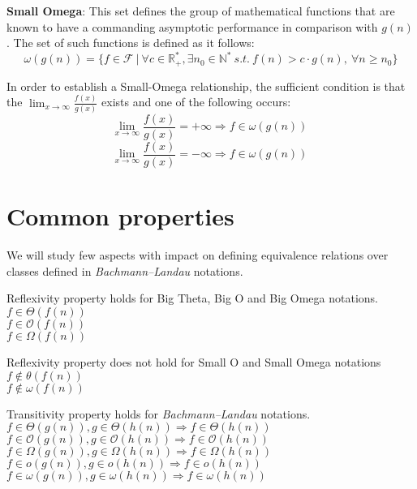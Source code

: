 \begin{definition}   
 \textbf{Small Omega}:
  This set defines the group of mathematical functions that are known to have a commanding asymptotic performance in comparison with  $g(n)$.
  The set of such functions is defined as it follows:
  \[\omega(g(n)) = \lbrace f \in \mathcal{F}\ |\ \forall c \in \mathbb{R}^{*}_{+}, \exists n_{0} \in \mathbb{N}^{*}\ s.t.\  f(n) > c \cdot g(n),\  \forall n \geq n_{0} \rbrace\]
  \end{definition}  
  \begin{lemma}
In order to establish a Small-Omega relationship, the sufficient condition is that the $ \lim_{x\to\infty} \frac{f(x)}{g(x)}$ exists and one of the following occurs:
  \[  \lim_{x\to\infty} \frac{f(x)}{g(x)} = +\infty \Rightarrow f \in \omega(g(n))\ \]   
  \[  \lim_{x\to\infty} \frac{f(x)}{g(x)} = -\infty \Rightarrow f \in \omega(g(n))\ \]  
  \end{lemma}

\section{Common properties}
We will study few aspects with impact on defining equivalence relations over classes defined in \textit{Bachmann–Landau} notations.
 \hfill\break
 \begin{theorem} Reflexivity property holds for Big Theta, Big O and Big Omega notations.  \\  $ f \in \Theta(f(n)) $ \\$ f \in \mathcal{O}(f(n)) $ \\$ f \in \Omega(f(n)) $
 \end{theorem}

\begin{theorem} Reflexivity property does not hold for Small O and Small Omega notations \\
 $ f \notin \theta(f(n)) $ \\$ f \notin \omega(f(n)) $ 
\end{theorem}

\begin{theorem} Transitivity property holds for \textit{Bachmann–Landau} notations.  \\  $ f \in \Theta(g(n)),  g \in \Theta(h(n)) \Rightarrow  f \in \Theta(h(n))$ \\
 $ f \in \mathcal{O}(g(n)),  g \in \mathcal{O}(h(n)) \Rightarrow  f \in \mathcal{O}(h(n))$ \\
 $ f \in \Omega(g(n)),  g \in \Omega(h(n)) \Rightarrow  f \in \Omega(h(n))$ \\
 $ f \in o(g(n)),  g \in o(h(n)) \Rightarrow  f \in o(h(n))$ \\
 $ f \in \omega(g(n)),  g \in \omega(h(n)) \Rightarrow  f \in \omega(h(n))$
\end{theorem} 

